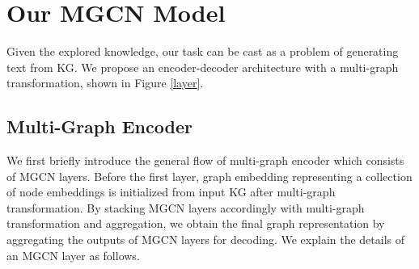 \documentclass[11pt,a4paper]{article}
\begin{document}
\section{Our MGCN Model}
Given the explored knowledge, our task can be cast as a problem of generating text from KG.
We propose an encoder-decoder architecture with a multi-graph transformation, shown in Figure \ref{layer}.

\begin{figure*}[t!]
\caption{\label{layer} Overview of our model architecture. There are  MGCN layers in the multi-graph encoder, and 2 LSTM layers in the decoder.  is the input graph representation at Layer , and its 6 copies together with the corresponding adjacent matrices 's of transformed graphs in the multi graph (refer to Figure \ref{multigraph}) are fed into individual basic encoders.  Finally, we obtain the graph representation  for the next layer by aggregating the representations from these encoders.}
\end{figure*}

\subsection{Multi-Graph Encoder}
We first briefly introduce the general flow of multi-graph encoder which consists of  MGCN layers.
Before the first layer, graph embedding  representing a collection of node embeddings is initialized from input KG after multi-graph transformation.
By stacking  MGCN layers accordingly with multi-graph transformation and aggregation, we obtain the final graph representation by aggregating the outputs of  MGCN layers for decoding. We explain the details of an MGCN layer as follows. 
\end{document}
